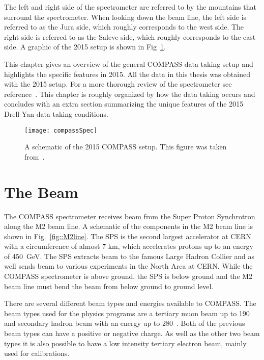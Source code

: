The left and right side of the spectrometer are referred to by the mountains
that surround the spectrometer.  When looking down the beam line, the left side
is referred to as the Jura side, which roughly corresponds to the west side.
The right side is referred to as the Saleve side, which roughly corresponds to
the east side.  A graphic of the 2015 setup is shown in
Fig~\ref{fig::compassSpec}.\par

This chapter gives an overview of the general COMPASS data taking setup and
highlights the specific features in 2015.  All the data in this thesis was
obtained with the 2015 setup.  For a more thorough review of the spectrometer
see reference~\cite{compassSpec}.  This chapter is roughly organized by how the
data taking occurs and concludes with an extra section summarizing the unique
features of the 2015 Drell-Yan data taking conditions. \par

\begin{figure}[h!t]
  \centering
  \texttt{[image: compassSpec]}
  \caption{A schematic of the 2015 COMPASS setup.  This figure was taken
    from~\cite{compasswebpage}.}
  \label{fig::compassSpec}
\end{figure}

\section{The Beam}
The COMPASS spectrometer receives beam from the Super Proton Synchrotron along
the M2 beam line.  A schematic of the components in the M2 beam line is shown in
Fig.~\ref{fig::M2line}.  The SPS is the second largest accelerator at CERN with
a circumference of almost 7 km, which accelerates protons up to an energy of
450~GeV.  The SPS extracts beam to the famous Large Hadron Collier and as well
sends beam to various experiments in the North Area at CERN.  While the COMPASS
spectrometer is above ground, the SPS is below ground and the M2 beam line must
bend the beam from below ground to ground level. \par

There are several different beam types and energies available to COMPASS.  The
beam types used for the physics programs are a tertiary muon beam up to
190~{\gvc} and secondary hadron beam with an energy up to 280~{\gvc}.  Both of
the previous beam types can have a positive or negative charge.  As well as the
other two beam types it is also possible to have a low intensity tertiary
electron beam, mainly used for calibrations. \par

